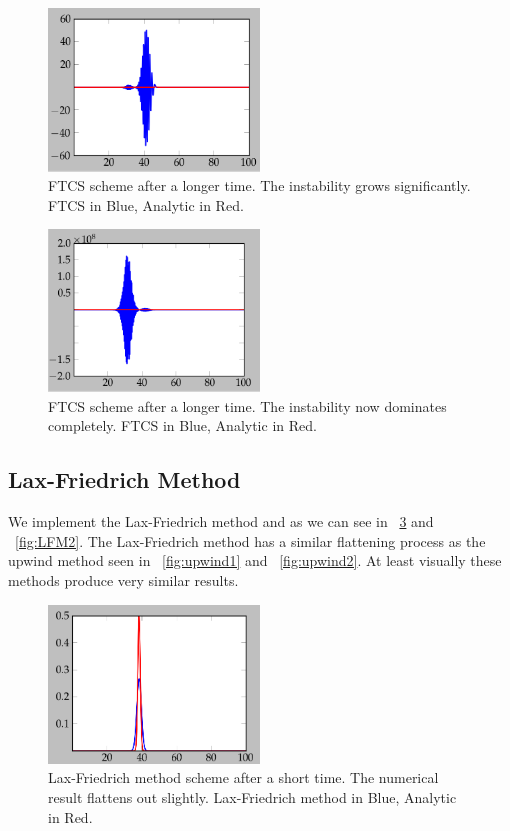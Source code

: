 \documentclass[11pt,letterpaper]{article}
\begin{document}
\begin{figure}[bth]
\centering
\includegraphics[width=0.5\textwidth]{Upwind4.png}
\caption{FTCS scheme after a longer time. The instability grows significantly. FTCS in Blue, Analytic in Red.}
\label{fig:upwind4}
\end{figure}

\begin{figure}[bth]
\centering
\includegraphics[width=0.5\textwidth]{Upwind5.png}
\caption{FTCS scheme after a longer time. The instability now dominates completely. FTCS in Blue, Analytic in Red.}
\label{fig:upwind5}
\end{figure}

\subsection{Lax-Friedrich Method}

We implement the Lax-Friedrich method and as we can see in ~\ref{fig:LFM1} and 
~\ref{fig:LFM2}. The Lax-Friedrich method has a similar flattening process as 
the upwind method seen in ~\ref{fig:upwind1} and ~\ref{fig:upwind2}. At least 
visually these methods produce very similar results. 

\begin{figure}[bth]
\centering
\includegraphics[width=0.5\textwidth]{LFM1.png}
\caption{Lax-Friedrich method scheme after a short time. The numerical result flattens out slightly. Lax-Friedrich method in Blue, Analytic in Red.}
\label{fig:LFM1}
\end{figure}
\end{document}

